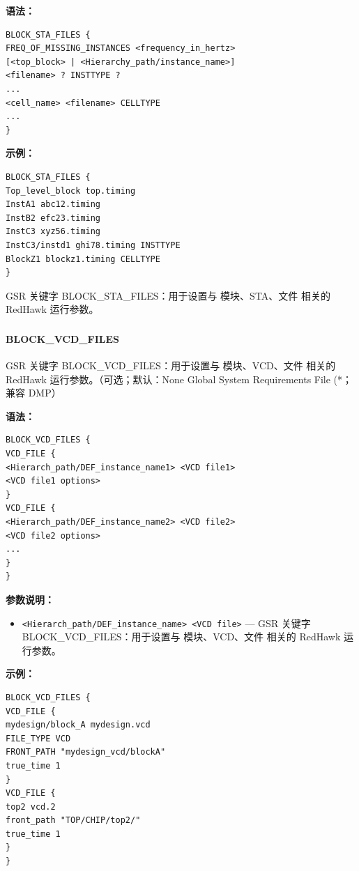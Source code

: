 \textbf{语法：}
\begin{lstlisting}
BLOCK_STA_FILES {
FREQ_OF_MISSING_INSTANCES <frequency_in_hertz>
[<top_block> | <Hierarchy_path/instance_name>]
<filename> ? INSTTYPE ?
...
<cell_name> <filename> CELLTYPE
...
}
\end{lstlisting}

\textbf{示例：}
\begin{lstlisting}
BLOCK_STA_FILES {
Top_level_block top.timing
InstA1 abc12.timing
InstB2 efc23.timing
InstC3 xyz56.timing
InstC3/instd1 ghi78.timing INSTTYPE
BlockZ1 blockz1.timing CELLTYPE
}
\end{lstlisting}

\begin{noteBox}
GSR 关键字 BLOCK\_STA\_FILES：用于设置与 模块、STA、文件 相关的 RedHawk 运行参数。
\end{noteBox}

\subsubsection{}
\paragraph*{BLOCK_VCD_FILES}

GSR 关键字 BLOCK_VCD_FILES：用于设置与 模块、VCD、文件 相关的 RedHawk 运行参数。（可选；默认：None Global System Requirements File (*；兼容 DMP）

\textbf{语法：}
\begin{lstlisting}
BLOCK_VCD_FILES {
VCD_FILE {
<Hierarch_path/DEF_instance_name1> <VCD file1>
<VCD file1 options>
}
VCD_FILE {
<Hierarch_path/DEF_instance_name2> <VCD file2>
<VCD file2 options>
...
}
}
\end{lstlisting}

\textbf{参数说明：}
\begin{itemize}
\item \texttt{<Hierarch\_path/DEF\_instance\_name> <VCD file>} — GSR 关键字 BLOCK\_VCD\_FILES：用于设置与 模块、VCD、文件 相关的 RedHawk 运行参数。
\end{itemize}

\textbf{示例：}
\begin{lstlisting}
BLOCK_VCD_FILES {
VCD_FILE {
mydesign/block_A mydesign.vcd
FILE_TYPE VCD
FRONT_PATH "mydesign_vcd/blockA"
true_time 1
}
VCD_FILE {
top2 vcd.2
front_path "TOP/CHIP/top2/"
true_time 1
}
}
\end{lstlisting}

